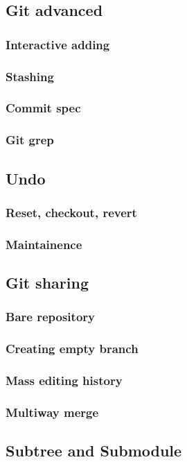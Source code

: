 \subsection{Git advanced}

\begin{frame}
	\frametitle{Interactive adding}
\end{frame}

\begin{frame}
	\frametitle{Stashing}
\end{frame}

\begin{frame}
	\frametitle{Commit spec}
\end{frame}

\begin{frame}
	\frametitle{Git grep}
\end{frame}

\subsection{Undo}

\begin{frame}
	\frametitle{Reset, checkout, revert}
\end{frame}

\begin{frame}
	\frametitle{Maintainence}
\end{frame}

\subsection{Git sharing}

\begin{frame}
	\frametitle{Bare repository}
\end{frame}

\begin{frame}
	\frametitle{Creating empty branch}
\end{frame}

\begin{frame}
	\frametitle{Mass editing history}
\end{frame}

\begin{frame}
	\frametitle{Multiway merge}
\end{frame}

\subsection{Subtree and Submodule}

